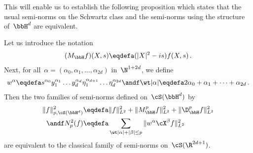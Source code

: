 This will enable us to establish the following proposition which states that the usual semi-norms on the Schwartz class and the semi-norms using the structure of~$\bbH^d$ are equivalent.

\begin{prop}\label{p:schwartz}
Let us introduce the notation
\[
(M_\bbH f) (X,s) \eqdefa (|X|^2- is) f(X,s)\,.
\]
Next, for all~$\alpha =(\alpha_0, \alpha_1, \dots, \alpha_{2d})$ in~$\N^{1+2d}$, we define
\[
w^\alpha \eqdefa s^{\alpha_0} y_1^{\alpha_1} \dots y_d^{\alpha_d} \eta_1^{\alpha_{d+1}} \dots \eta_d^{\alpha_{2d}}
\andf \wt |\alpha|\eqdefa 2\alpha_0+\alpha_1+\dots +\alpha_{2d}\,.
\]
Then the two families of semi-norms defined on~$\cS(\bbH^d)$ by
\[
\begin{aligned}
\|f\|^2_{p,\cS(\bbH^d)} & \eqdefa \|f\|_{L^2} ^2+ \|M_\bbH^pf\|_{L^2}^2 +\| \D_\bbH^p f \|^2_{L^2} \\ \andf
N_p^2(f) & \eqdefa \sum_{\wt |\alpha|+|\beta| \leq p }\| w^\alpha \cX^\beta f\|^2_{L^2}
\end{aligned}
\]
are equivalent to the classical family of semi-norms on~$\cS(\R^{2d+1})$.
\end{prop}

